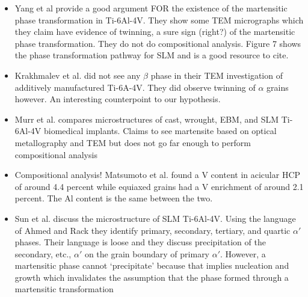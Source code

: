 \begin{itemize}
	\item Yang et al \cite{Yang2016} provide a good argument FOR the existence of the martensitic phase transformation in Ti-6Al-4V. They show some TEM micrographs which they claim have evidence of twinning, a sure sign (right?) of the martensitic phase transformation. They do not do compositional analysis. Figure 7 shows the phase transformation pathway for SLM and is a good resource to cite.
	\item Krakhmalev et al. \cite{Krakhmalev2016} did not see any $\beta$ phase in their TEM investigation of additively manufactured Ti-6A-4V. They did observe twinning of $\alpha$ grains however. An interesting counterpoint to our hypothesis.
	\item Murr et al. \cite{Murr2009} compares microstructures of cast, wrought, EBM, and SLM Ti-6Al-4V biomedical implants. Claims to see martensite based on optical metallography and TEM but does not go far enough to perform compositional analysis
	\item Compositional analysis! \cite{Matsumoto2011} Matsumoto et al. found a V content in acicular HCP of around 4.4 percent while equiaxed grains had a V enrichment of around 2.1 percent. The Al content is the same between the two.
	\item Sun et al. \cite{Sun2019} discuss the microstructure of SLM Ti-6Al-4V. Using the language of Ahmed and Rack they identify primary, secondary, tertiary, and quartic $\alpha'$ phases. Their language is loose and they discuss precipitation of the secondary, etc., $\alpha'$ on the grain boundary of primary $\alpha'$. However, a martensitic phase cannot `precipitate' because that implies nucleation and growth which invalidates the assumption that the phase formed through a martensitic transformation
	
\end{itemize}